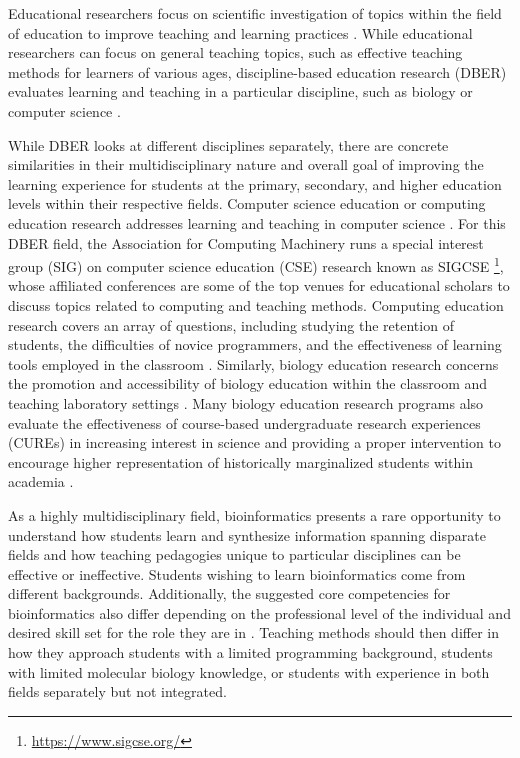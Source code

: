 Educational researchers focus on scientific investigation of topics within the field of education to improve teaching and learning practices \cite{charles1998,nationalresearchcouncilu.s.2005}. While educational researchers can focus on general teaching topics, such as effective teaching methods for learners of various ages, discipline-based education research (DBER) evaluates learning and teaching in a particular discipline, such as biology or computer science \cite{slater2015}. 

While DBER looks at different disciplines separately, there are concrete similarities in their multidisciplinary nature and overall goal of improving the learning experience for students at the primary, secondary, and higher education levels within their respective fields. Computer science education or computing education research addresses learning and teaching in computer science \cite{randolph2008,almstrum2005,cooper2014,pears2005,malmi2010,guzdial2015}. For this DBER field, the Association for Computing Machinery runs a special interest group (SIG) on computer science education (CSE) research known as SIGCSE \footnote{\href{https://www.sigcse.org/}{https://www.sigcse.org/}}, whose affiliated conferences are some of the top venues for educational scholars to discuss topics related to computing and teaching methods. Computing education research covers an array of questions, including studying the retention of students, the difficulties of novice programmers, and the effectiveness of learning tools employed in the classroom \cite{randolph2008,almstrum2005,cooper2014,pears2005,malmi2010,guzdial2015}. Similarly, biology education research concerns the promotion and accessibility of biology education within the classroom and teaching laboratory settings \cite{bahar1999,mintzes2001,labov2010,pranjol2022,brownell2015,heim2019,bakshi2016}. Many biology education research programs also evaluate the effectiveness of course-based undergraduate research experiences (CUREs) in increasing interest in science and providing a proper intervention to encourage higher representation of historically marginalized students within academia \cite{pranjol2022,brownell2015,heim2019,bakshi2016}. 

As a highly multidisciplinary field, bioinformatics presents a rare opportunity to understand how students learn and synthesize information spanning disparate fields and how teaching pedagogies unique to particular disciplines can be effective or ineffective. Students wishing to learn bioinformatics come from different backgrounds. Additionally, the suggested core competencies for bioinformatics also differ depending on the professional level of the individual and desired skill set for the role they are in \cite{tan2009,rubinstein2014,attwood2019,zhan2019,labov2010,mulder2018}. Teaching methods should then differ in how they approach students with a limited programming background, students with limited molecular biology knowledge, or students with experience in both fields separately but not integrated.  

